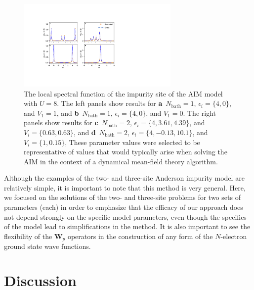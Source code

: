 \documentclass[aip,reprint,table,xcdraw,usenames,dvipsnames]{revtex4-1}
\begin{document}
\begin{figure}[t!]
    \centering
    \includegraphics[width=0.7\textwidth]{SpectralFunctions.pdf}
    \caption{The local spectral function of the impurity site of the AIM model with $U=8$. The left panels show results for \textbf{a}~$N_\mathrm{bath} = 1$, $\epsilon_i = \{4,0\}$, and $V_1=1$, and \textbf{b}~$N_\mathrm{bath} = 1$, $\epsilon_i = \{4, 0\}$, and $V_1=0$. The right panels show results for 
    \textbf{c}~$N_\mathrm{bath} = 2$, $\epsilon_i = \{4,3.61, 4.39\}$, and $V_i = \{0.63, 0.63\}$, and \textbf{d}~$N_\mathrm{bath} = 2$, $\epsilon_i = \{4,-0.13, 10.1\}$, and $V_i = \{1, 0.15\}$, 
    These parameter values were selected to be representative of values that would typically arise when solving the AIM in the context of a dynamical mean-field theory algorithm. 
    }
    \label{fig:spec}
\end{figure}

Although the examples of the two- and three-site Anderson impurity model are relatively simple, it is important to note that this method is very general. Here, we focused on the solutions of the two- and three-site problems for two sets of parameters (each) in order to emphasize that the efficacy of our approach does not depend strongly on the specific model parameters, even though the specifics of the model lead to simplifications in the method. It is also important to see the flexibility of the $\mathbf{W}_p$ operators in the construction of any form of the $N$-electron ground state wave functions.

\section{Discussion} \label{sec:discussion}
\end{document}

